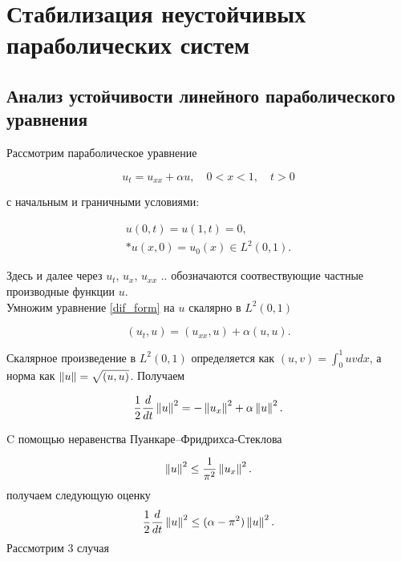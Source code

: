 \section{Стабилизация неустойчивых параболических систем}

\subsection{Анализ устойчивости линейного параболического уравнения}

Рассмотрим параболическое уравнение

\begin{equation}\label{dif_form}
    u_t = u_{xx} + \alpha u, \quad 0 < x < 1, \quad t > 0
\end{equation}

с начальным и граничными условиями:

\begin{gather}\label{d_control}
    u(0, t) = u(1, t) = 0, \\*
    u(x, 0) = u_{0}(x) \in L^2(0, 1). \nonumber
\end{gather}

Здесь и далее через $u_t$, $u_x$, $u_{xx}$ .. обозначаются соотвествующие
частные производные функции $u$.\\
Умножим уравнение \eqref{dif_form} на $u$ скалярно в $L^2(0, 1)$

\begin{equation*}
    (u_t, u) = (u_{xx}, u) + \alpha (u, u).
\end{equation*}

Скалярное произведение в $L^2(0, 1)$ определяется как $(u, v) = \int_0^1 uv dx$,
а норма как $\left\lVert u\right\rVert = \sqrt{(u, u)}$. Получаем

\begin{equation}\label{int_form}
    \frac{1}{2}\frac{d}{dt}\left\lVert u\right\rVert^2 = -\left\lVert u_x\right\rVert^2 + \alpha \left\lVert u\right\rVert^2.
\end{equation}

C помощью неравенства Пуанкаре–Фридрихса-Стеклова

\begin{equation*}
    \left\lVert u\right\rVert^2 \le \frac{1}{\pi^2} \left\lVert u_x\right\rVert^2.
\end{equation*}
получаем следующую оценку 
\begin{equation}\label{stable_opr}
    \frac{1}{2}\frac{d}{dt}\left\lVert u\right\rVert^2 \le (\alpha - \pi^2)\left\lVert u\right\rVert^2.
\end{equation}
Рассмотрим 3 случая

